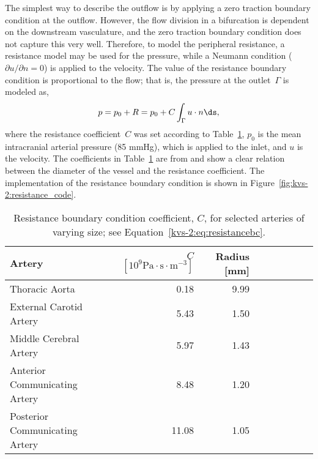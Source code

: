The simplest way to describe the outflow is by applying a zero
traction boundary condition at the outflow. However, the flow division
in a bifurcation is dependent on the downstream vasculature, and the
zero traction boundary condition does not capture this very
well. Therefore, to model the peripheral resistance, a resistance
model may be used for the pressure, while a Neumann condition
(${\partial u / \partial n} = 0 $) is applied to the velocity. The
value of the resistance boundary condition is proportional to the
flow; that is, the pressure at the outlet~$\Gamma$ is modeled as,
\begin{equation} \label{kvs-2:eq:resistancebc}
  p = p_0 + R = p_0 + C \int_\Gamma u \cdot n \ds,
\end{equation}
where the resistance coefficient~$C$ was set according to
Table~\ref{resistance_coeff}, $p_0$ is the mean intracranial arterial
pressure (85 mmHg), which is applied to the inlet, and $u$ is the
velocity. The coefficients in Table~\ref{resistance_coeff} are
from \citet{AlastrueyParkerPeiroEtAl2007} and show a clear relation
between the diameter of the vessel and the resistance coefficient. The
implementation of the resistance boundary condition is shown in
Figure~\ref{fig:kvs-2:resistance_code}.

\begin{table}[!t]
\linenumbersep-4.6pc
\centering
\begin{tabular}{l*{7}{r}r}\toprule
Artery & $C$ $ [10^9 \mathrm{Pa} \cdot \mathrm{s}  \cdot \mathrm{m}^{-3}]$ & Radius [mm]\\\midrule
Thoracic Aorta			&  0.18 &  	9.99\\
External Carotid Artery  	& 5.43   &	1.50\\
Middle Cerebral Artery  	& 5.97   &	1.43\\
Anterior Communicating Artery  	& 8.48   &	1.20\\
Posterior Communicating Artery  & 11.08   &	1.05\\
\bottomrule
\end{tabular}
\caption{Resistance boundary condition coefficient, $C$,
for selected arteries of varying size; see Equation~\eqref{kvs-2:eq:resistancebc}.}
\label{resistance_coeff}
\end{table}

